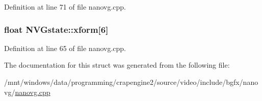 Definition at line 71 of file nanovg.\+cpp.

\hypertarget{struct_n_v_gstate_ad59f377ee80c48e3e37e4deb3464e030}{
\subsubsection[{xform}]{\setlength{\rightskip}{0pt plus 5cm}float N\+V\+Gstate\+::xform\mbox{[}6\mbox{]}}}\label{struct_n_v_gstate_ad59f377ee80c48e3e37e4deb3464e030}


Definition at line 65 of file nanovg.\+cpp.



The documentation for this struct was generated from the following file\+:\begin{DoxyCompactItemize}
\item 
/mnt/windows/data/programming/crapengine2/source/video/include/bgfx/nanovg/\hyperlink{nanovg_8cpp}{nanovg.\+cpp}\end{DoxyCompactItemize}
